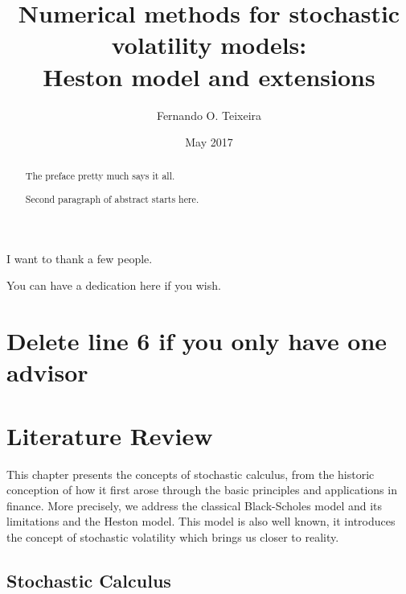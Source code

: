 \documentclass[12pt,twoside]{reedthesis}
\title{\textbf{\Huge{Numerical methods for stochastic volatility models: \\[20pt] Heston model and extensions}}}
\author{Fernando O. Teixeira}
\date{May 2017}
\theoremstyle{definition}
\theoremstyle{definition}
\theoremstyle{remark}
\begin{document}
      \maketitle
  
  \frontmatter %
  \pagestyle{empty} %

      \begin{acknowledgements}
      I want to thank a few people.
    \end{acknowledgements}
  
  
      \hypersetup{linkcolor=black}
    \setcounter{tocdepth}{2}
    \tableofcontents
  
      \listoftables
  
      \listoffigures
  
      \begin{abstract}
      The preface pretty much says it all. \par  Second paragraph of abstract
      starts here.
    \end{abstract}
  
      \begin{dedication}
      You can have a dedication here if you wish.
    \end{dedication}
  
  \mainmatter %
  \pagestyle{fancyplain} %

  \chapter{Delete line 6 if you only have one
  advisor}\label{delete-line-6-if-you-only-have-one-advisor}
  
  \chapter{Literature Review}\label{lt-review}
  
  This chapter presents the concepts of stochastic calculus, from the
  historic conception of how it first arose through the basic principles
  and applications in finance. More precisely, we address the classical
  Black-Scholes model and its limitations and the Heston model. This model
  is also well known, it introduces the concept of stochastic volatility
  which brings us closer to reality.
  
  \section{Stochastic Calculus}\label{stochastic-calculus}
  
\end{document}
